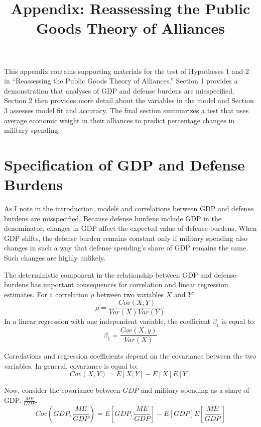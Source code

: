 \documentclass[12pt]{article}
\title{
\textbf{Appendix: Reassessing the Public Goods Theory of Alliances}
	}
\begin{document}
\maketitle 

\doublespace

This appendix contains supporting materials for the test of Hypotheses 1 and 2 in ``Reassessing the Public Goods Theory of Alliances.'' 
Section 1 provides a demonstration that analyses of GDP and defense burdens are misspecified. 
Section 2 then provides more detail about the variables in the model and Section 3 assesses model fit and accuracy. 
The final section summarizes a test that uses average economic weight in their alliances to predict percentage changes in military spending. 


\section{Specification of GDP and Defense Burdens} 

As I note in the introduction, models and correlations between GDP and defense burdens are misspecified. 
Because defense burdens include GDP in the denominator, changes in GDP affect the expected value of defense burdens. 
When GDP shifts, the defense burden remains constant only if military spending also changes in such a way that defense spending's share of GDP remains the same.
Such changes are highly unlikely.


The deterministic component in the relationship between GDP and defense burdens has important consequences for correlation and linear regression estimates. 
For a correlation $\rho$ between two variables $X$ and $Y$:
\begin{equation}
\rho = \frac{Cov(X,Y)}{Var(X)Var(Y)} 
\end{equation}
In a linear regression with one independent variable, the coefficient $\beta_1$ is equal to:
\begin{equation}
\beta_1 = \frac{Cov(X,y)}{Var(X)} 
\end{equation} 

Correlations and regression coefficients depend on the covariance between the two variables. 
In general, covariance is equal to:
\begin{equation}
Cov(X, Y) = E[X,Y] - E[X] E[Y]
\end{equation}

Now, consider the covariance between $GDP$ and military spending as a share of GDP, $\frac{ME}{GDP}$. 
\begin{equation}
Cov\left(GDP, \frac{ME}{GDP} \right) = E\left[GDP, \frac{ME}{GDP} \right] - E[GDP] E\left[\frac{ME}{GDP} \right]
\end{equation}
\end{document}
